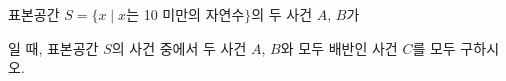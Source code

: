 표본공간 $S=\{x \mid x$는 10 미만의 자연수$\}$의 두 사건 $A$, $B$가\par\smallskip{}\par\smallskip\noindent 일 때, 표본공간 $S$의 사건 중에서 두 사건 $A$, $B$와 모두 배반인 사건 $C$를 모두 구하시오.

